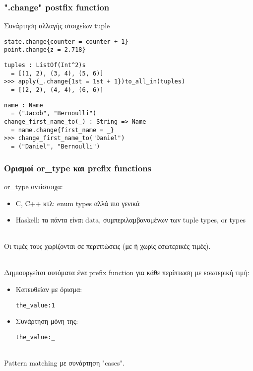 \documentclass{beamer}
\def\e{\foreignlanguage{english}}
\def\h{\e{Haskell}}
\begin{document}
\begin{frame}[fragile]

\frametitle{\e{".change" postfix function}}

Συνάρτηση αλλαγής στοιχείων \e{tuple}

\begin{otherlanguage}{english}
\begin{verbatim}
state.change{counter = counter + 1}
point.change{z = 2.718}
\end{verbatim}
\pause
\begin{verbatim}
tuples : ListOf(Int^2)s
  = [(1, 2), (3, 4), (5, 6)]
>>> apply(_.change{1st = 1st + 1})to_all_in(tuples)
  = [(2, 2), (4, 4), (6, 6)]
\end{verbatim}
\pause
\begin{verbatim}
name : Name
  = ("Jacob", "Bernoulli")
change_first_name_to(_) : String => Name
  = name.change{first_name = _}
>>> change_first_name_to("Daniel")
  = ("Daniel", "Bernoulli")
\end{verbatim}
\end{otherlanguage}

\end{frame}

\begin{frame}[fragile]

\frametitle{Ορισμοί \e{or\_type} και \e{prefix functions}}

\e{or\_type} αντίστοιχα:

\begin{itemize}

\item \e{C, C++} κτλ: \e{enum types} αλλά πιο γενικά

\item \h:
τα πάντα είναι \e{data}, συμπεριλαμβανομένων των \e{tuple types}, \e{or types}
\\~\

\end{itemize}

\pause
Οι τιμές τους χωρίζονται σε περιπτώσεις (με ή χωρίς εσωτερικές τιμές).
\\~\

\pause
Δημιουργείται αυτόματα ένα \e{prefix function} για κάθε περίπτωση με εσωτερική
τιμή:

\begin{itemize}

\item Κατευθείαν με όρισμα:
\begin{otherlanguage}{english}
\verb|the_value:1|
\end{otherlanguage}

\item Συνάρτηση μόνη της:
\begin{otherlanguage}{english}
\verb|the_value:_|
\\~\
\end{otherlanguage}

\end{itemize}

\pause
\e{Pattern matching} με συνάρτηση \e{"cases"}.

\end{frame}
\end{document}
